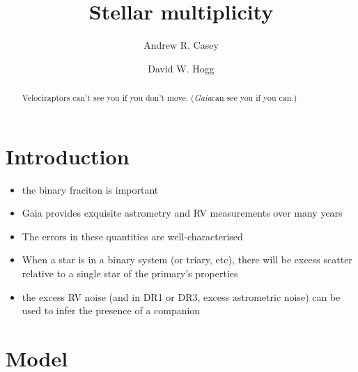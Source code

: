\documentclass[twocolumn]{aastex61}
\newcommand{\project}[1]{\textsl{#1}}
\newcommand{\Gaia}{\project{Gaia}}
\begin{document}
\title{Stellar multiplicity}


\author[0000-0003-0174-0564]{Andrew R. Casey}

\author[0000-0003-2866-9403]{David W. Hogg}

\begin{abstract}
Velociraptors can't see you if you don't move. (\Gaia can see you if you can.)
\end{abstract}



\section{Introduction} \label{sec:intro}

\begin{itemize}
\item the binary fraciton is important
\item Gaia provides exquisite astrometry and RV measurements over many years
\item The errors in these quantities are well-characterised
\item When a star is in a binary system (or triary, etc), there will be excess scatter relative to a single star of the primary's properties
\item the excess RV noise (and in DR1 or DR3, excess astrometric noise) can be used to infer the presence of a companion
\end{itemize}


\section{Model}
\end{document}
